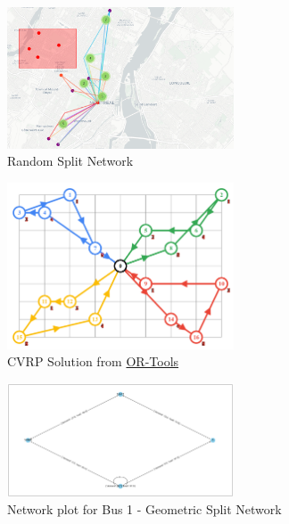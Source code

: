 \documentclass[12pt]{article}
\begin{document}
\begin{appendices}
    \begin{figure}[!htb]
        \centering
        \includegraphics[width=0.6\textwidth]{random-network.png}
        \caption{Random Split Network}
        \label{fig:random-network}
    \end{figure}

    \begin{figure}[!htb]
        \centering
        \includegraphics[width=0.6\textwidth]{google-cvrp.png}
        \caption{CVRP Solution from \href{https://developers.google.com/optimization/routing/cvrp}{OR-Tools}}
        \label{fig:google-cvrp}
    \end{figure}

    \begin{figure}[!htb]
        \centering
        \includegraphics[width=0.6\textwidth]{geometric-network-plot.png}
        \caption{Network plot for Bus 1 - Geometric Split Network}
        \label{route:geometric-network-plot}
    \end{figure}


\end{appendices}
\end{document}
